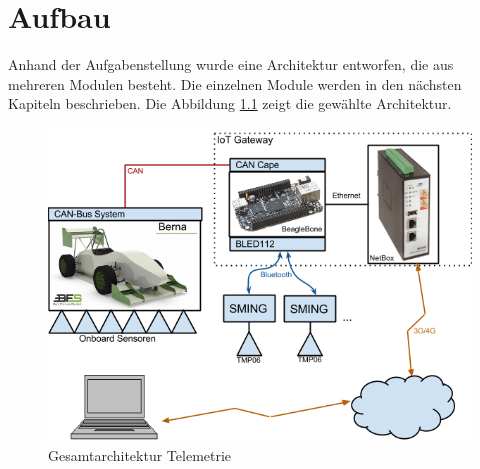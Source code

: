 \chapter{Aufbau}
\label{chap:aufbau}

Anhand der Aufgabenstellung wurde eine Architektur entworfen, die aus mehreren Modulen besteht. Die einzelnen Module werden in den nächsten Kapiteln beschrieben. Die Abbildung \ref{fig:gesamtarchitektur_telemetrie} zeigt die gewählte Architektur.


\begin{figure}[hbtp]
    \center
    \includegraphics[width=\textwidth]{bilder/gesamtarchitektur.png}
    \caption{Gesamtarchitektur Telemetrie}
    \label{fig:gesamtarchitektur_telemetrie}
\end{figure}

